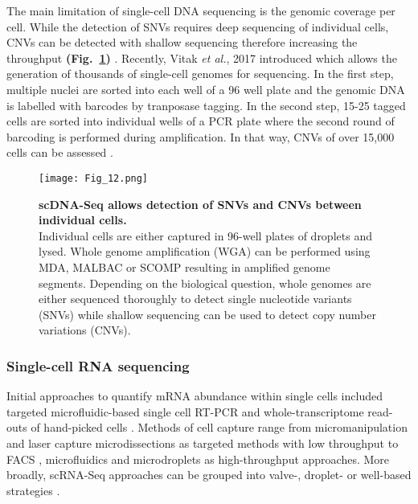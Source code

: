 The main limitation of single-cell DNA sequencing is the genomic coverage per cell. While the detection of SNVs requires deep sequencing of individual cells, CNVs can be detected with shallow sequencing therefore increasing the throughput \textbf{(Fig.~\ref{fig0:scDNA-Seq})} \citep{Knouse2016, Baslan2015}. Recently, Vitak \emph{et al.}, 2017 introduced  which allows the generation of thousands of single-cell genomes for sequencing. In the first step, multiple nuclei are sorted into each well of a 96 well plate and the genomic DNA is labelled with barcodes by tranposase tagging. In the second step, 15-25 tagged cells are sorted into individual wells of a PCR plate where the second round of barcoding is performed during amplification. In that way, CNVs of over 15,000 cells can be assessed \citep{Vitak2017}.

\begin{figure}[!h]
\centering
\texttt{[image: Fig\_12.png]}
\caption[\Gls{scDNA-Seq} allows detection of SNVs and CNVs between individual cells]{\textbf{\Gls{scDNA-Seq} allows detection of SNVs and CNVs between individual cells.}\\
Individual cells are either captured in 96-well plates of droplets and lysed. Whole genome amplification (WGA) can be performed using MDA, MALBAC or SCOMP resulting in amplified genome segments. Depending on the biological question, whole genomes are either sequenced thoroughly to detect single nucleotide variants (SNVs) while shallow sequencing can be used to detect copy number variations (CNVs).}
\label{fig0:scDNA-Seq}
\end{figure}


\subsubsection{Single-cell RNA sequencing}

Initial approaches to quantify mRNA abundance within single cells included targeted microfluidic-based single cell RT-PCR \citep{Warren2006} and whole-transcriptome read-outs of hand-picked cells \citep{Tang2009}. Methods of cell capture range from micromanipulation \citep{Grindberg2014} and laser capture microdissections \citep{Frumkin2008} as targeted methods with low throughput to  \gls{FACS} \citep{Hayashi2010, Dalerba2011, Jaitin2014}, microfluidics \citep{Trapnell2014, Treutlein2014} and microdroplets \citep{Klein2015, Macosko2015} as high-throughput approaches. More broadly, \gls{scRNA-Seq} approaches can be grouped into valve-, droplet- or well-based strategies \citep{Prakadan2017}. \\


